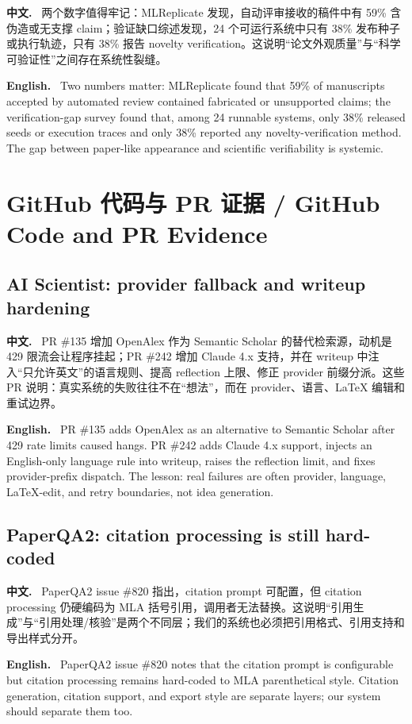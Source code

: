 \documentclass[UTF8,11pt]{ctexart}
\newcommand{\zh}{\par\noindent\textbf{中文.}\ }
\newcommand{\en}{\par\noindent\textbf{English.}\ }
\begin{document}
\zh
两个数字值得牢记：MLReplicate 发现，自动评审接收的稿件中有 59\% 含伪造或无支撑 claim；验证缺口综述发现，24 个可运行系统中只有 38\% 发布种子或执行轨迹，只有 38\% 报告 novelty verification。这说明“论文外观质量”与“科学可验证性”之间存在系统性裂缝。
\en
Two numbers matter: MLReplicate found that 59\% of manuscripts accepted by automated review contained fabricated or unsupported claims; the verification-gap survey found that, among 24 runnable systems, only 38\% released seeds or execution traces and only 38\% reported any novelty-verification method. The gap between paper-like appearance and scientific verifiability is systemic.

\section{GitHub 代码与 PR 证据 / GitHub Code and PR Evidence}

\subsection{AI Scientist: provider fallback and writeup hardening}
\zh
PR \#135 增加 OpenAlex 作为 Semantic Scholar 的替代检索源，动机是 429 限流会让程序挂起；PR \#242 增加 Claude 4.x 支持，并在 writeup 中注入“只允许英文”的语言规则、提高 reflection 上限、修正 provider 前缀分派。这些 PR 说明：真实系统的失败往往不在“想法”，而在 provider、语言、LaTeX 编辑和重试边界。
\en
PR \#135 adds OpenAlex as an alternative to Semantic Scholar after 429 rate limits caused hangs. PR \#242 adds Claude 4.x support, injects an English-only language rule into writeup, raises the reflection limit, and fixes provider-prefix dispatch. The lesson: real failures are often provider, language, LaTeX-edit, and retry boundaries, not idea generation.

\subsection{PaperQA2: citation processing is still hard-coded}
\zh
PaperQA2 issue \#820 指出，citation prompt 可配置，但 citation processing 仍硬编码为 MLA 括号引用，调用者无法替换。这说明“引用生成”与“引用处理/核验”是两个不同层；我们的系统也必须把引用格式、引用支持和导出样式分开。
\en
PaperQA2 issue \#820 notes that the citation prompt is configurable but citation processing remains hard-coded to MLA parenthetical style. Citation generation, citation support, and export style are separate layers; our system should separate them too.
\end{document}
